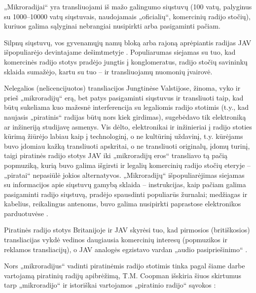 \documentclass[kursinis-darbas]{vukf}
\begin{document}
„Mikroradijai“ yra transliuojami iš mažo galingumo siųstuvų (100 vatų, palyginus su 1000--10000 vatų siųstuvais, naudojamais „oficialių“, komercinių radijo stočių), kuriuos galima sąlyginai nebrangiai nusipirkti arba pasigaminti pačiam.

Silpnų siųstuvų, vos gyvenamųjų namų bloką arba rajoną aprėpiantis radijas JAV išpopuliarėjo devintajame dešimtmetyje \cite[p.~2]{tmc_fcc_enforcement_difficulties_with_unlicensed_micro_radio}. Populiarumas siejamas su tuo, kad komercinės radijo stotys pradėjo jungtis į konglomeratus, radijo stočių savininkų sklaida sumažėjo, kartu su tuo – ir transliuojamų nuomonių įvairovė.

Nelegalios (nelicencijuotos) transliacijos Jungtinėse Valstijose, žinoma, vyko ir prieš „mikroradijų“ erą, bet patys pasigaminti siųstuvus ir transliuoti taip, kad būtų sukeliama kuo mažesnė interferencija su legaliomis radijo stotimis (t.y., kad naujasis „piratinis“ radijas būtų nors kiek girdimas), sugebėdavo tik elektroniką ar inžineriją studijavę asmenys. Vis dėlto, elektronikai ir inžinieriai į radijo stoties kūrimą žiūrėjo labiau kaip į technologinį, o ne kultūrinį uždavinį, t.y. kūrėjams buvo įdomiau kažką transliuoti apskritai, o ne transliuoti originalų, įdomų turinį, taigi piratinės radijo stotys JAV iki „mikroradijų eros“ transliavo tą pačią popmuziką, kurią buvo galima išgirsti ir legalių komercinių radijo stočių eteryje – „piratai“ nepasiūlė jokios alternatyvos. „Mikroradijų“ išpopuliarėjimas siejamas su informacijos apie siųstuvų gamybą sklaida – instrukcijas, kaip pačiam galima pasigaminti radijo siųstuvą, pradėjo spausdinti populiarūs žurnalai; medžiagas ir kabelius, reikalingus antenoms, buvo galima nusipirkti paprastose elektronikos parduotuvėse \cite[p.~37]{ay_low_power_fm_transmitters_electronics_now}.

Piratinės radijo stotys Britanijoje ir JAV skyrėsi tuo, kad pirmosios (britiškosios) transliacijas vykdė vedinos daugiausia komercinių interesų (popmuzikos ir reklamos transliacijų), o JAV analogės egzistavo vardan „audio pasipriešinimo“ \cite[p.~135]{hc_key_concepts_in_radio_studies}.

Nors „mikroradijus“ vadinti piratinėmis radijo stotimis tinka pagal šiame darbe vartojamą piratinių radijų apibrėžimą, T.M. Coopman išskiria šiuos skirtumus tarp „mikroradijo“ ir istoriškai vartojamos „piratinio radijo“ sąvokos \cite[p.~3]{tmc_fcc_enforcement_difficulties_with_unlicensed_micro_radio}:
\end{document}

